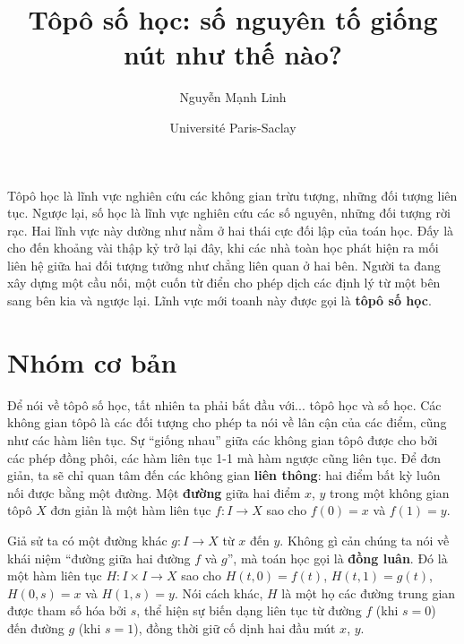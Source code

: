 \documentclass[12pt]{article}
\title{Tôpô số học: số nguyên tố giống nút như thế nào?}
\author{Nguyễn Mạnh Linh}
\date{Universit\'e Paris-Saclay}
\begin{document}
\maketitle

Tôpô học là lĩnh vực nghiên cứu các không gian trừu tượng, những đối tượng liên tục. Ngược lại, số học là lĩnh vực nghiên cứu các số nguyên, những đối tượng rời rạc. Hai lĩnh vực này dường như nằm ở hai thái cực đối lập của toán học. Đấy là cho đến khoảng vài thập kỷ trở lại đây, khi các nhà toàn học phát hiện ra mối liên hệ giữa hai đối tượng tưởng như chẳng liên quan ở hai bên. Người ta đang xây dựng một cầu nối, một cuốn từ điển cho phép dịch các định lý từ một bên sang bên kia và ngược lại. Lĩnh vực mới toanh này được gọi là {\bf tôpô số học}.



\section{Nhóm cơ bản}

Để nói về tôpô số học, tất nhiên ta phải bắt đầu với... tôpô học và số học. Các không gian tôpô là các đối tượng cho phép ta nói về lân cận của các điểm, cũng như các hàm liên tục. Sự ``giống nhau'' giữa các không gian tôpô được cho bởi các {phép đồng phôi}, các hàm liên tục 1-1 mà hàm ngược cũng liên tục. Để đơn giản, ta sẽ chỉ quan tâm đến các không gian {\bf liên thông}: hai điểm bất kỳ luôn nối được bằng một đường. Một {\bf đường} giữa hai điểm $x$, $y$ trong một không gian tôpô $X$ đơn giản là một hàm liên tục $f: I \to X$ sao cho $f(0) = x$ và $f(1) = y$.

Giả sử ta có một đường khác $g: I \to X$ từ $x$ đến $y$. Không gì cản chúng ta nói về khái niệm ``đường giữa hai đường $f$ và $g$'', mà toán học gọi là {\bf đồng luân}. Đó là một hàm liên tục $H: I \times I \to X$ sao cho $H(t,0) = f(t)$, $H(t,1) = g(t)$, $H(0,s) = x$ và $H(1,s) = y$. Nói cách khác, $H$ là một họ các đường trung gian được tham số hóa bởi $s$, thể hiện sự biến dạng liên tục từ đường $f$ (khi $s=0$) đến đường $g$ (khi $s = 1$), đồng thời giữ cố dịnh hai đầu mút $x$, $y$. 
\end{document}
